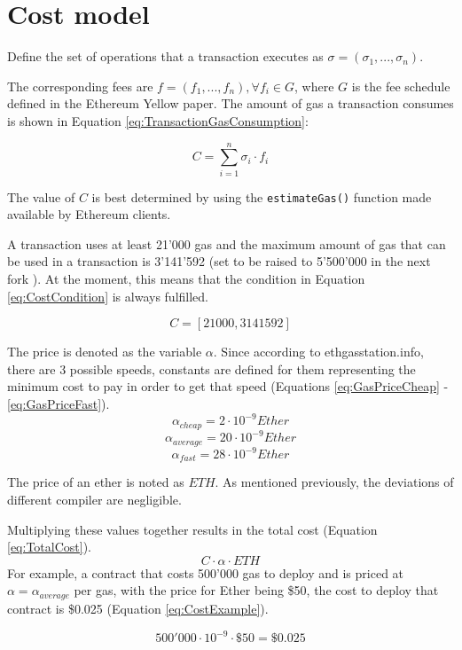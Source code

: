 \section{Cost model}

Define the set of operations that a transaction executes as $ \sigma = (\sigma_1, ..., \sigma_n) $.

The corresponding fees are $ f = (f_1, ..., f_n), \forall f_i \in G $, where $ G $ is the fee schedule defined in the Ethereum Yellow paper. The amount of gas a transaction consumes is shown in Equation \ref{eq:TransactionGasConsumption}:

\begin{equation}
C = \sum_{i = 1}^n \sigma_i \cdot f_i
\label{eq:TransactionGasConsumption}
\end{equation}

The value of $ C $ is best determined by using the \texttt{estimateGas()} function made available by Ethereum clients.

A transaction uses at least 21'000 gas and the maximum amount of gas that can be used in a transaction is 3'141'592 \cite{BlockGasLimit} (set to be raised to 5'500'000 in the next fork \cite{EIP150}). At the moment, this means that the condition in Equation \ref{eq:CostCondition} is always fulfilled.

\begin{equation}
    C = [21000, 3141592]
    \label{eq:CostCondition}
\end{equation}

The price is denoted as the variable $ \alpha $. Since according to ethgasstation.info, there are 3 possible speeds, constants are defined for them representing the minimum cost to pay in order to get that speed (Equations \ref{eq:GasPriceCheap} - \ref{eq:GasPriceFast}).
\begin{equation}
    \alpha_{cheap} = 2 \cdot 10^{-9} Ether
    \label{eq:GasPriceCheap}
\end{equation}
\begin{equation}
    \alpha_{average} = 20 \cdot 10^{-9} Ether
    \label{eq:GasPriceAverage}
\end{equation}
\begin{equation}
    \alpha_{fast} = 28 \cdot 10^{-9} Ether
    \label{eq:GasPriceFast}
\end{equation}

The price of an ether is noted as $ ETH $. As mentioned previously, the deviations of different compiler are negligible.

Multiplying these values together results in the total cost (Equation \ref{eq:TotalCost}). 
\begin{equation}
 C \cdot \alpha \cdot ETH
 \label{eq:TotalCost}
\end{equation}  For example, a contract that costs 500'000 gas to deploy and is priced at $ \alpha = \alpha_{average} $ per gas, with the price for Ether being \$50, the cost to deploy that contract is \$0.025 (Equation \ref{eq:CostExample}).

\begin{equation}
    500'000 \cdot 10^{-9} \cdot \$50 = \$0.025
    \label{eq:CostExample}
\end{equation}
